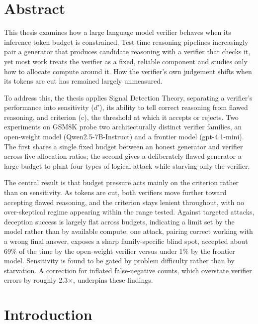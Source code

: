 \documentclass[12pt, a4paper, oneside]{report}
\begin{document}
\tableofcontents
\newpage



\chapter{Abstract}
This thesis examines how a large language model verifier behaves when its inference token budget is
 constrained. Test-time reasoning pipelines increasingly pair a generator that produces candidate 
 reasoning with a verifier that checks it, yet most work treats the verifier as a fixed, reliable 
 component and studies only how to allocate compute around it. How the verifier's own judgement shifts
  when its tokens are cut has remained largely unmeasured.

To address this, the thesis applies Signal Detection Theory, separating a verifier's performance into
   sensitivity ($d′$), its ability to tell correct reasoning from flawed reasoning, and criterion (c), 
   the threshold at which it accepts or rejects. Two experiments on GSM8K probe two architecturally 
   distinct verifier families, an open-weight model (Qwen2.5-7B-Instruct) and a frontier model (gpt-4.1-mini).
    The first shares a single fixed budget between an honest generator and verifier across five allocation
     ratios; the second gives a deliberately flawed generator a large budget to plant four types of logical 
     attack while starving only the verifier.

The central result is that budget pressure acts mainly on the criterion rather than on sensitivity. 
As tokens are cut, both verifiers move further toward accepting flawed reasoning, and the criterion stays 
lenient throughout, with no over-skeptical regime appearing within the range tested. Against targeted
 attacks, deception success is largely flat across budgets, indicating a limit set by the model rather 
 than by available compute; one attack, pairing correct working with a wrong final answer, exposes a 
 sharp family-specific blind spot, accepted about 69\% of the time by the open-weight verifier versus under
  1\% by the frontier model. Sensitivity is found to be gated by problem difficulty rather than by 
  starvation. A correction for inflated false-negative counts, which overstate verifier errors by roughly
   2.3×, underpins these findings.

\newpage



\chapter{Introduction}
\end{document}
